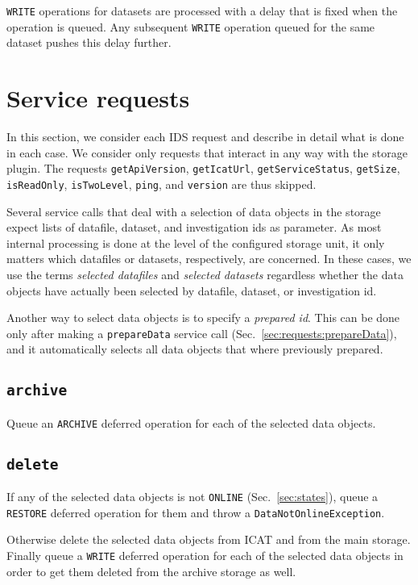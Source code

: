 \documentclass[paper=a4]{scrartcl}
\begin{document}
\texttt{WRITE} operations for datasets are processed with a delay
that is fixed when the operation is queued. Any subsequent
\texttt{WRITE} operation queued for the same dataset pushes this
delay further.


\section{Service requests}
\label{sec:requests}

In this section, we consider each IDS request and describe in detail
what is done in each case. We consider only requests that interact in
any way with the storage plugin. The requests \texttt{getApiVersion},
\texttt{getIcatUrl}, \texttt{getServiceStatus}, \texttt{getSize},
\texttt{isReadOnly}, \texttt{isTwoLevel}, \texttt{ping}, and
\texttt{version} are thus skipped.

Several service calls that deal with a selection of data objects in
the storage expect lists of datafile, dataset, and investigation ids
as parameter. As most internal processing is done at the level of the
configured storage unit, it only matters which datafiles or datasets,
respectively, are concerned. In these cases, we use the terms
\emph{selected datafiles} and \emph{selected datasets} regardless
whether the data objects have actually been selected by datafile,
dataset, or investigation id.

Another way to select data objects is to specify a
\emph{prepared id}. This can be done only after making a
\texttt{prepareData} service call
(Sec.\ \ref{sec:requests:prepareData}), and it automatically
selects all data objects that where previously prepared.

\subsection{\texttt{archive}}

Queue an \texttt{ARCHIVE} deferred operation for each of the selected
data objects.

\subsection{\texttt{delete}}
\label{sec:requests:delete}

If any of the selected data objects is not \texttt{ONLINE}
(Sec.\ \ref{sec:states}), queue a \texttt{RESTORE} deferred operation
for them and throw a \texttt{DataNotOnlineException}.

Otherwise delete the selected data objects from ICAT and from the main
storage. Finally queue a \texttt{WRITE} deferred operation for each
of the selected data objects in order to get them deleted from the
archive storage as well.
\end{document}
